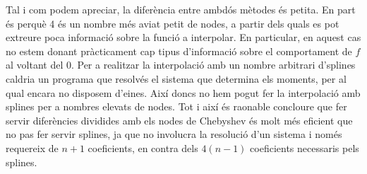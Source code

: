 \documentclass[12pt]{article}
\numberwithin{table}{section}
\numberwithin{figure}{section}
\numberwithin{equation}{section}
\begin{document}
Tal i com podem apreciar, la diferència entre ambdós mètodes és petita. En part és perquè 4 és un nombre més aviat petit de nodes, a partir dels quals es pot extreure poca informació sobre la funció a interpolar. En particular, en aquest cas no estem donant pràcticament cap tipus d'informació sobre el comportament de \( f \) al voltant del 0. Per a realitzar la interpolació amb un nombre arbitrari d'splines caldria un programa que resolvés el sistema que determina els moments, per al qual encara no disposem d'eines. Així doncs no hem pogut fer la interpolació amb splines per a nombres elevats de nodes. Tot i així és raonable concloure que fer servir diferències dividides amb els nodes de Chebyshev és molt més eficient que no pas fer servir splines, ja que no involucra la resolució d'un sistema i només requereix de \( n+1 \) coeficients, en contra dels \( 4(n - 1) \) coeficients necessaris pels splines.
\end{document}
